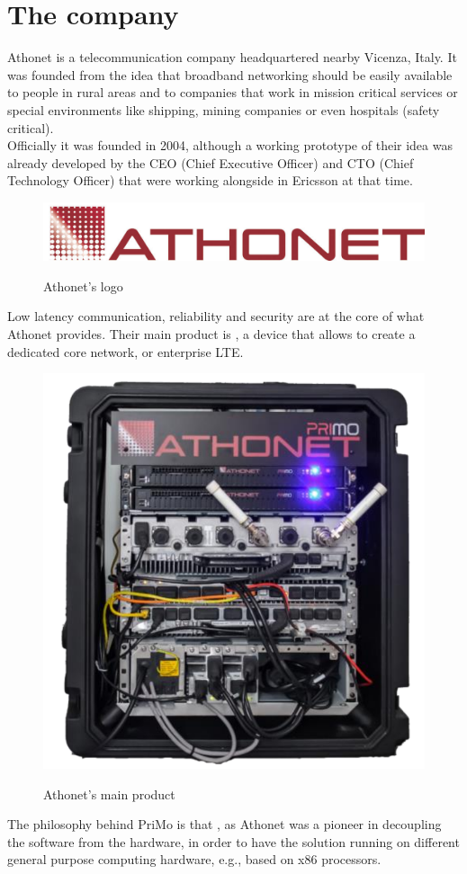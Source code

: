\section{The company}
	Athonet\cite{athonet} is a telecommunication company headquartered nearby Vicenza, Italy.
	It was founded from the idea that \gls{broadband networking} should be easily available to people in rural areas and to companies that work in mission critical services or special environments like shipping, mining companies or even hospitals (safety critical).\\
	Officially it was founded in 2004, although a working prototype of their idea was already developed by the CEO (Chief Executive Officer) and CTO (Chief Technology Officer) that were working alongside in Ericsson\cite{ericsson} at that time.
	\begin{figure}[H]
		\centering
		\includegraphics[width=.7\textwidth]{resources/ath_logo}\\
		\caption[Athonet's logo]{Athonet's logo}
	\end{figure}
	\gls{Low latency} communication, reliability and security are at the core of what Athonet provides.
	Their main product is , a device that allows to create a dedicated \gls{core network}, or enterprise \gls{LTE}.
	\begin{figure}[H]
		\centering
		\includegraphics[width=.5\textwidth]{resources/gianluca_primo}\\
		\caption[]{Athonet's main product \textbf{}\cite{gianluca_primo}}
	\end{figure}
	The philosophy behind PriMo is that , as Athonet was a pioneer in decoupling the software from the hardware, in order to have the solution running on different general purpose computing hardware, e.g., based on x86 processors.\\
